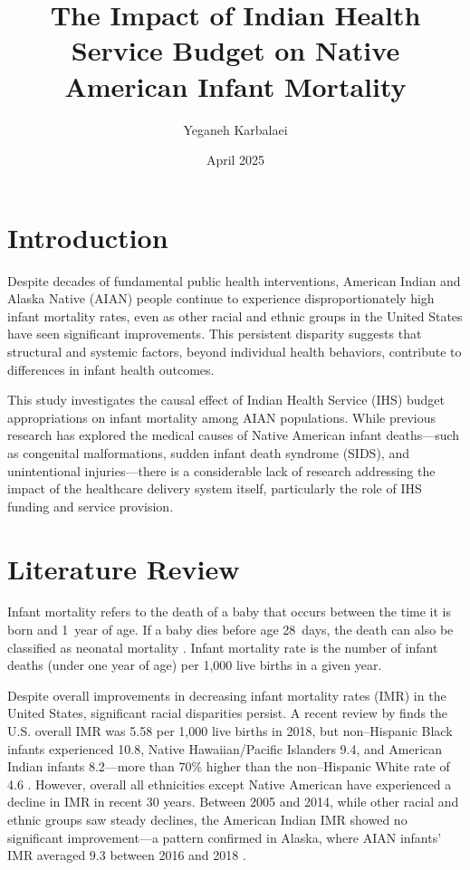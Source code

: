 \documentclass{article}
\title{The Impact of Indian Health Service Budget on Native American Infant Mortality}
\author{Yeganeh Karbalaei}
\date{April 2025}
\begin{document}
\doublespacing
\maketitle

\section{Introduction}
Despite decades of fundamental public health interventions, American Indian and Alaska Native (AIAN) people continue to experience disproportionately high infant mortality rates, even as other racial and ethnic groups in the United States have seen significant improvements. This persistent disparity suggests that structural and systemic factors, beyond individual health behaviors, contribute to differences in infant health outcomes.

This study investigates the causal effect of Indian Health Service (IHS) budget appropriations on infant mortality among AIAN populations. While previous research has explored the medical causes of Native American infant deaths—such as congenital malformations, sudden infant death syndrome (SIDS), and unintentional injuries—there is a considerable lack of research addressing the impact of the healthcare delivery system itself, particularly the role of IHS funding and service provision.

\section{Literature Review}
Infant mortality refers to the death of a baby that occurs between the time it is born and 1~year of age. If a baby dies before age 28~days, the death can also be classified as neonatal mortality \citep{infantmortality}. Infant mortality rate is the number of infant deaths (under one year of age) per 1,000 live births in a given year.

Despite overall improvements in decreasing infant mortality rates (IMR) in the United States, significant racial disparities persist. A recent review by \citet{jang_review_2022} finds the U.S. overall IMR was 5.58 per 1,000 live births in 2018, but non--Hispanic Black infants experienced 10.8, Native Hawaiian/Pacific Islanders 9.4, and American Indian infants 8.2—more than 70\% higher than the non--Hispanic White rate of 4.6 \citep{jang_review_2022}. However, overall all ethnicities except Native American have experienced a decline in IMR in recent 30 years.  Between 2005 and 2014, while other racial and ethnic groups saw steady declines, the American Indian IMR showed no significant improvement—a pattern confirmed in Alaska, where AIAN infants’ IMR averaged 9.3 between 2016 and 2018 \citep{jang_review_2022,the_university_of_arizona_whats_2017}.
\end{document}
